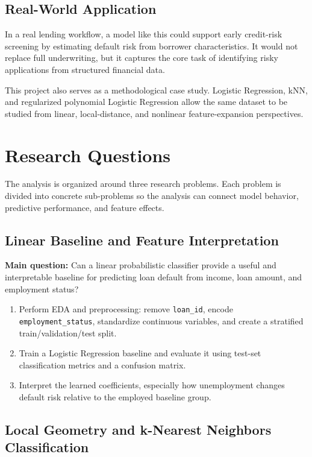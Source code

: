 \documentclass[12pt]{article}
\begin{document}
\subsection{Real-World Application}

In a real lending workflow, a model like this could support early credit-risk screening by estimating default risk from borrower characteristics. It would not replace full underwriting, but it captures the core task of identifying risky applications from structured financial data.

This project also serves as a methodological case study. Logistic Regression, kNN, and regularized polynomial Logistic Regression allow the same dataset to be studied from linear, local-distance, and nonlinear feature-expansion perspectives.

\section{Research Questions}

The analysis is organized around three research problems. Each problem is divided into concrete sub-problems so the analysis can connect model behavior, predictive performance, and feature effects.

\subsection{Linear Baseline and Feature Interpretation}

\textbf{Main question:} Can a linear probabilistic classifier provide a useful and interpretable baseline for predicting loan default from income, loan amount, and employment status?

\begin{enumerate}[label=\textbf{1(\alph*)}]
    \item Perform EDA and preprocessing: remove \texttt{loan\_id}, encode \texttt{employment\_status}, standardize continuous variables, and create a stratified train/validation/test split.
    \item Train a Logistic Regression baseline and evaluate it using test-set classification metrics and a confusion matrix.
    \item Interpret the learned coefficients, especially how unemployment changes default risk relative to the employed baseline group.
\end{enumerate}

\subsection{Local Geometry and k-Nearest Neighbors Classification}
\end{document}
